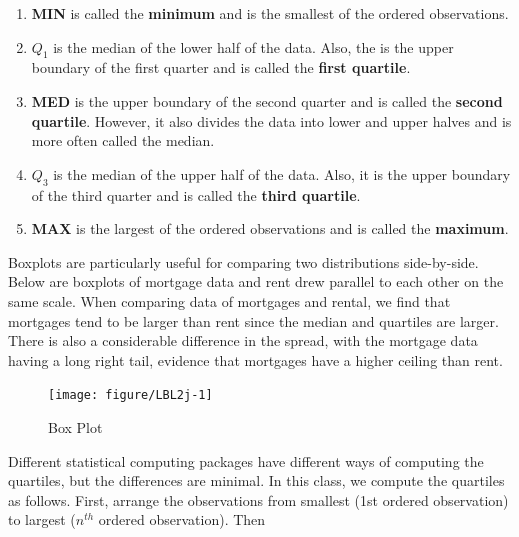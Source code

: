 \documentclass[11pt, chapterprefix=true]{scrbook}\usepackage[]{graphicx}\usepackage[]{color}
\begin{document}
{\small{
\begin{enumerate}
\item	\textbf{MIN} is called the \textbf{minimum} and is the smallest of the ordered observations.
\item	\textbf{$Q_1$} is the median of the lower half of the data.  Also, the is the upper boundary of the first quarter and is called the \textbf{first quartile}.
\item	\textbf{MED} is the upper boundary of the second quarter and is called the \textbf{second quartile}.  However, it also divides the data into lower and upper halves and is more often called the median.
\item	\textbf{$Q_3$} is the median of the upper half of the data.  Also, it is the upper boundary of the third quarter and is called the \textbf{third quartile}.
\item	\textbf{MAX} is the largest of the ordered observations and is called the \textbf{maximum}.
\end{enumerate}
}}

Boxplots are particularly useful for comparing two distributions side-by-side.  Below are boxplots of mortgage data and rent drew parallel to each other on the same scale.  When comparing data of mortgages and rental, we find that mortgages tend to be larger than rent since the median and quartiles are larger.  There is also a considerable difference in the spread, with the mortgage data having a long right tail, evidence that mortgages have a higher ceiling than rent.

\begin{figure}[ht]

\caption{Box Plot }



{\centering \texttt{[image: figure/LBL2j-1]} 

}




\end{figure}

Different statistical computing packages have different ways of computing the quartiles, but the differences are minimal.  In this class, we compute the quartiles as follows.  First, arrange the observations from smallest (1st ordered observation) to largest ($n^{th}$ ordered observation).  Then

\end{document}
